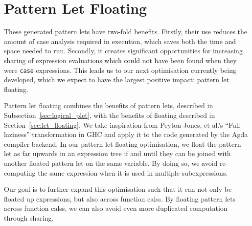 \section{Pattern Let Floating}

These generated pattern lets have two-fold benefits. Firstly, their use reduces the amount of case analysis required in execution, which saves both the time and space needed to run. Secondly, it creates significant opportunities for increasing sharing of expression evaluations which could not have been found when they were \lstinline{case} expressions. This leads us to our next optimisation currently being developed, which we expect to have the largest positive impact: pattern let floating.

Pattern let floating combines the benefits of pattern lets, described in Subsection~\ref{sec:logical_plet}, with the benefits of floating described in Section~\ref{sec:let_floating}. We take inspiration from Peyton Jones, et al.'s ``Full laziness'' transformation in GHC and apply it to the code generated by the Agda compiler backend.\cite{jones1996} In our pattern let floating optimisation, we float the pattern let as far upwards in an expression tree if and until they can be joined with another floated pattern let on the same variable.  By doing so, we avoid re-computing the same expression when it is used in multiple subexpressions.

Our goal is to further expand this optimisation such that it can not only be floated up expressions, but also across function calss. By floating pattern lets across function calss, we can also avoid even more duplicated computation through sharing.
